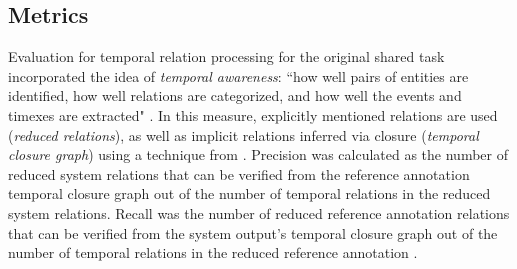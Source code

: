 \documentclass[11pt]{article}
\begin{document}
\begin{table*}[t]
\centering
{}
\caption{Internal Evaluation on Platinum Data \label{internal}}
\end{table*}

\subsection{Metrics}
\label{metrics}

Evaluation for temporal relation processing for the original shared task incorporated the idea of \emph{temporal awareness}: ``how well pairs of entities are identified, how well relations are categorized, and how well the events and timexes are extracted" \cite{UzZaman:13}. In this measure, explicitly mentioned relations are used (\emph{reduced relations}), as well as implicit relations inferred via closure (\emph{temporal closure graph}) using a technique from . Precision was calculated as the number of reduced system relations that can be verified from the reference annotation temporal closure graph out of the number of temporal relations in the reduced system relations. Recall was the number of reduced reference annotation relations that can be verified from the system output's temporal closure graph out of the number of temporal relations in the reduced reference annotation \cite{UzZaman:13}.
\end{document}
